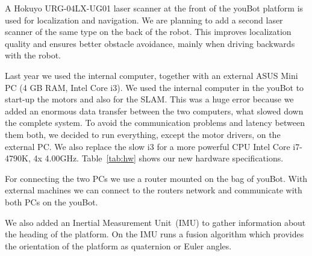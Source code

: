 A Hokuyo URG-04LX-UG01 laser scanner at the front of the youBot platform is used for localization and navigation. We are planning to add a second laser scanner of the same type on the back of the robot. This improves localization quality and ensures better obstacle avoidance, mainly when driving backwards with the robot.

Last year we used the internal computer, together with an external ASUS Mini PC (4 GB RAM, Intel Core i3). We used the internal computer in the youBot to start-up the motors and also for the SLAM. This was a huge error because we added an enormous data transfer between the two computers, what slowed down the complete system. To avoid the communication problems and latency between them both, we decided to run everything, except the motor drivers, on the external PC. We also replace the slow i3 for a more powerful CPU Intel Core i7-4790K, 4x 4.00GHz. Table~\ref{tab:hw} shows our new hardware specifications. 



For connecting the two PCs we use a router mounted on the bag of youBot. With external machines we can connect to the routers network and communicate with both PCs on the youBot.

We also added an Inertial Measurement Unit~(IMU) to gather information about the heading of the platform. On the IMU runs a fusion algorithm which provides the orientation of the platform as quaternion or Euler angles.

\clearpage
